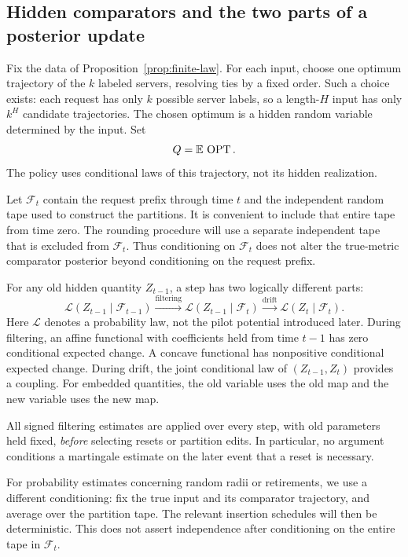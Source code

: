 \subsection{Hidden comparators and the two parts of a posterior update}

Fix the data of Proposition~\ref{prop:finite-law}. For each input,
choose one optimum trajectory of the \(k\) labeled servers, resolving
ties by a fixed order. Such a choice exists: each request has only
\(k\) possible server labels, so a length-\(H\) input has only \(k^H\)
candidate trajectories. The chosen optimum is a hidden random variable
determined by the input. Set
\[
                         Q=\mathbb E\,\operatorname{OPT} .
\]
The policy uses conditional laws of this trajectory, not its hidden
realization.

Let \(\mathcal F_t\) contain the request prefix through time \(t\)
and the independent random tape used to construct the partitions.
It is convenient to include that entire tape from time zero. The
rounding procedure will use a separate independent tape that is
excluded from \(\mathcal F_t\). Thus conditioning on \(\mathcal F_t\)
does not alter the true-metric comparator posterior beyond
conditioning on the request prefix.

For any old hidden quantity \(Z_{t-1}\), a step has two logically
different parts:
\[
 \mathcal L(Z_{t-1}\mid\mathcal F_{t-1})
 \xrightarrow{\mathrm{filtering}}
 \mathcal L(Z_{t-1}\mid\mathcal F_t)
 \xrightarrow{\mathrm{drift}}
 \mathcal L(Z_t\mid\mathcal F_t).
\]
Here \(\mathcal L\) denotes a probability law, not the pilot potential
introduced later. During filtering, an affine functional with
coefficients held from time \(t-1\) has zero conditional expected
change. A concave functional has nonpositive conditional expected
change. During drift, the joint conditional law of
\((Z_{t-1},Z_t)\) provides a coupling. For embedded quantities, the
old variable uses the old map and the new variable uses the new map.

All signed filtering estimates are applied over every step, with old
parameters held fixed, \emph{before} selecting resets or partition
edits. In particular, no argument conditions a martingale estimate on
the later event that a reset is necessary.

For probability estimates concerning random radii or retirements, we
use a different conditioning: fix the true input and its comparator
trajectory, and average over the partition tape. The relevant
insertion schedules will then be deterministic. This does not assert
independence after conditioning on the entire tape in \(\mathcal F_t\).


